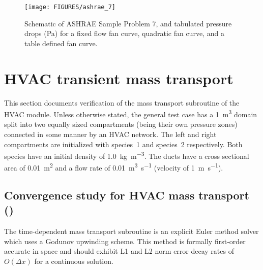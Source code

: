 \documentclass[11pt]{book}
\begin{document}
\begin{figure}[ht]
\centering
\texttt{[image: FIGURES/ashrae\_7]}
\caption[Results of  test cases]{Schematic of ASHRAE Sample Problem 7, and tabulated pressure drops (Pa) for a fixed flow fan curve, quadratic fan curve, and a table defined fan curve.}
\label{ASHRAE7}
\end{figure}

\section{HVAC transient mass transport}
This section documents verification of the mass transport subroutine of the HVAC module. Unless otherwise stated, the general test case has a \SI{1}{\meter\cubed} domain split into two equally sized compartments (being their own pressure zones) connected in some manner by an HVAC network. The left and right compartments are initialized with species~1 and species~2 respectively. Both species have an initial density of \SI[per-mode=symbol]{1.0}{\kilogram\per\meter\cubed}. The ducts have a cross sectional area of \SI{0.01}{m^2} and a flow rate of \SI[per-mode=symbol]{0.01}{\meter\cubed\per\second} (velocity of \SI[per-mode=symbol]{1}{\meter\per\second}).

\subsection{Convergence study for HVAC mass transport (\texorpdfstring{}{HVAC\_mass\_transport\_conv\_x})}
\label{HVAC_mass_transport_conv_0020}
\label{HVAC_mass_transport_conv_0040}
\label{HVAC_mass_transport_conv_0080}
\label{HVAC_mass_transport_conv_0160}
\label{HVAC_mass_transport_conv_0320}
The time-dependent mass transport subroutine is an explicit Euler method solver which uses a Godunov upwinding scheme. This method is formally first-order accurate in space and should exhibit L1 and L2 norm error decay rates of \(O(\Delta x)\) for a continuous solution.
\end{document}
